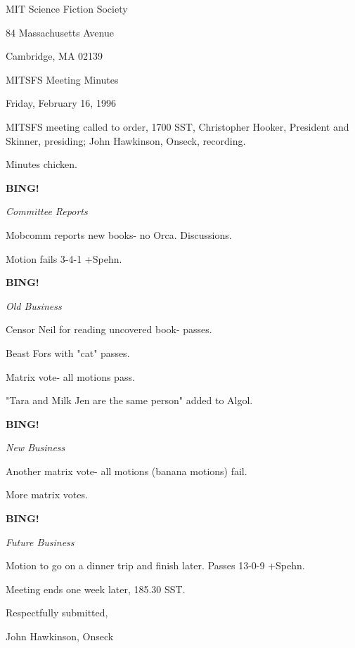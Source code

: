 \documentclass[12pt]{article}
\newcommand{\bing}{{\bf BING!} }
\newcommand{\goto}[1]{\bing \vskip 12pt \centerline{{\em{#1}}}}
\begin{document}
\begin{center}

MIT Science Fiction Society 

84 Massachusetts Avenue

Cambridge, MA 02139

\vspace{12pt}

MITSFS Meeting Minutes 

Friday, February 16, 1996

\end{center}
 
\vspace{18pt}

\setlength{\parskip}{6pt}

\noindent
MITSFS meeting called to order, 1700 SST,
Christopher Hooker, President and Skinner, presiding; John Hawkinson, Onseck, recording.

Minutes chicken.

\goto{Committee Reports}

Mobcomm reports new books- no Orca. Discussions.

Motion fails 3-4-1 +Spehn.

\goto{Old Business}

Censor Neil for reading uncovered book- passes.

Beast Fors with "cat" passes.

Matrix vote- all motions pass.

"Tara and Milk Jen are the same person" added to Algol.

\goto{New Business}

Another matrix vote- all motions (banana motions) fail.

More matrix votes.

\goto{Future Business}

Motion to go on a dinner trip and finish later. Passes 13-0-9 +Spehn.

\vspace{12pt}

\noindent
Meeting ends one week later, 185.30 SST.

\vspace{18pt}

\centerline{Respectfully submitted,}
\centerline{John Hawkinson, Onseck}
\end{document}
